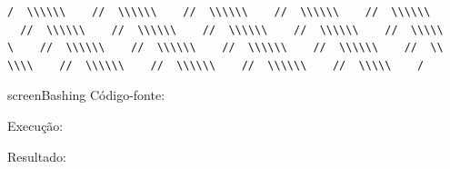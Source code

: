 \documentclass[aspectratio=169]{beamer}
\begin{document}
{\begin{verbatim}
/  \\\\\\    //  \\\\\\    //  \\\\\\    //  \\\\\\    //  \\\\\\  
  //  \\\\\\    //  \\\\\\    //  \\\\\\    //  \\\\\\    //  \\\\\
\    //  \\\\\\    //  \\\\\\    //  \\\\\\    //  \\\\\\    //  \\
\\\\    //  \\\\\\    //  \\\\\\    //  \\\\\\    //  \\\\\    /
\end{verbatim}
}  

\begin{frame}[allowframebreaks]{screenBashing}
Código-fonte:

\magnoA

Execução:

\magnoB

Resultado:

\magnoC
\end{frame}
\end{document}
